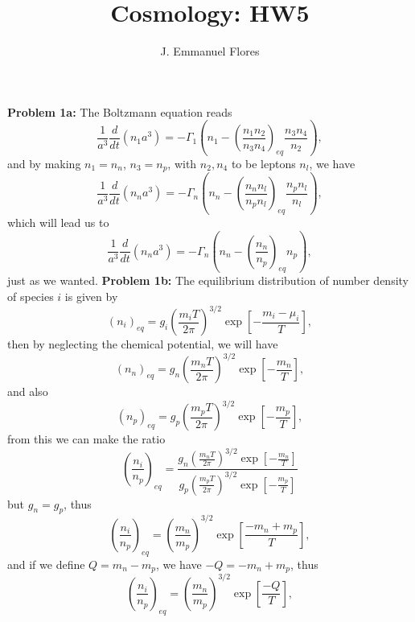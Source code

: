 \documentclass[11pt]{article}
\title{Cosmology: HW5}
\author{J. Emmanuel Flores}
\begin{document}
\maketitle
\textbf{Problem 1a:}
The Boltzmann equation reads 
\begin{displaymath}
  \frac{1}{a^3}\frac{d}{dt}(n_1 a^3) =-\Gamma_1 \left( n_1 -\left(\frac{n_1 n_2}{n_3 n_4}\right)_{eq} \frac{n_3 n_4}{n_2}\right),
\end{displaymath}
and by making $n_1 = n_n$, $n_3 = n_p$, with $n_2, n_4$ to be leptons $n_l$, we have
\begin{displaymath}
  \frac{1}{a^3}\frac{d}{dt}(n_n a^3) =-\Gamma_n \left( n_n -\left(\frac{n_n n_l}{n_p n_l}\right)_{eq} \frac{n_p n_l}{n_l}\right),
\end{displaymath}
which will lead us to
\begin{displaymath}
  \frac{1}{a^3}\frac{d}{dt}(n_n a^3) = -\Gamma_n \left( n_n -\left(\frac{n_n}{n_p}\right)_{eq} n_p\right),
\end{displaymath}
just as we wanted.
\newline
\textbf{Problem 1b:}
The equilibrium distribution of number density of species $i$ is given by 
\begin{displaymath}
  (n_i)_{eq} = g_{i}\left(\frac{m_i T}{2\pi}\right)^{3/2} \exp{\left[-\frac{m_i-\mu_i}{T}\right]},
\end{displaymath}
then by neglecting the chemical potential, we will have 
\begin{displaymath}
  (n_n)_{eq} = g_{n}\left(\frac{m_n T}{2\pi}\right)^{3/2} \exp{\left[-\frac{m_n}{T}\right]},
\end{displaymath}
and also
\begin{displaymath}
  (n_p)_{eq} = g_{p}\left(\frac{m_p T}{2\pi}\right)^{3/2} \exp{\left[-\frac{m_p}{T}\right]},
\end{displaymath}
from this we can make the ratio
\begin{displaymath}
  \left(\frac{n_i}{n_p}\right)_{eq} = \frac{g_{n}\left(\frac{m_n T}{2\pi}\right)^{3/2} \exp{\left[-\frac{m_n}{T}\right]}}{g_{p}\left(\frac{m_p T}{2\pi}\right)^{3/2} \exp{\left[-\frac{m_p}{T}\right]}}
\end{displaymath}
but $g_n = g_p$, thus
\begin{displaymath}
  \left(\frac{n_i}{n_p}\right)_{eq} = \left(\frac{m_n}{m_p}\right)^{3/2}\exp{\left[\frac{-m_n + m_p}{T}\right]},
\end{displaymath}
and if we define $Q = m_n-m_p$, we have $-Q = -m_n+m_p$, thus
\begin{displaymath}
  \left(\frac{n_i}{n_p}\right)_{eq} = \left(\frac{m_n}{m_p}\right)^{3/2}\exp{\left[\frac{-Q}{T}\right]},
\end{displaymath}
\end{document}
